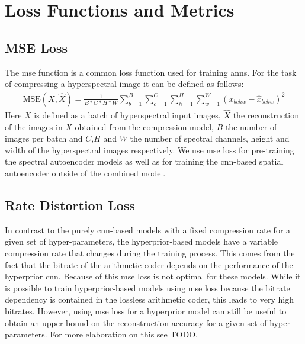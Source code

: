 \section{Loss Functions and Metrics}

\subsection{MSE Loss}
The \ac{mse} function is a common loss function used for training \acp{ann}. For the task of compressing a hyperspectral image it can be defined as follows:
\begin{align}
\text{MSE}(X,\hat{X}) = \frac{1}{B*C*H*W} \sum_{b=1}^{B}\sum_{c=1}^{C}\sum_{h=1}^H\sum_{w=1}^W (x_{bchw} - \hat{x}_{bchw})^2
\end{align}
Here $X$ is defined as a batch of hyperspectral input images, $\hat{X}$ the reconstruction of the images in $X$ obtained from the compression model, $B$ the number of images per batch and $C$,$H$ and $W$ the number of spectral channels, height and width of the hyperspectral images respectively.
We use \ac{mse} loss for pre-training the spectral autoencoder models as well as for training the \ac{cnn}-based spatial autoencoder outside of the combined model.

\subsection{Rate Distortion Loss\label{sec:ch5ratedistortion}}
In contrast to the purely \ac{cnn}-based models with a fixed compression rate for a given set of hyper-parameters, the hyperprior-based models have a variable compression rate that changes during the training process. This comes from the fact that the bitrate of the arithmetic coder depends on the performance of the hyperprior \ac{cnn}. Because of this \ac{mse} loss is not optimal for these models. While it is possible to train hyperprior-based models using \ac{mse} loss because the bitrate dependency is contained in the lossless arithmetic coder, this leads to very high bitrates. However, using \ac{mse} loss for a hyperprior model can still be useful to obtain an upper bound on the reconstruction accuracy for a given set of hyper-parameters. For more elaboration on this see TODO.

